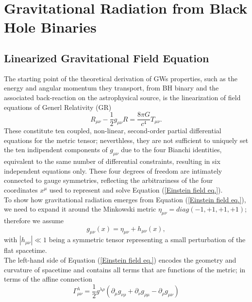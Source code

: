 \documentclass[12pt,twoside,openany]{book}
\begin{document}
\section{Gravitational Radiation from Black Hole Binaries}





\subsection{Linearized Gravitational Field Equation}

The starting point of the theoretical derivation of GWs properties, such as the energy and angular momentum they transport, from BH binary and the associated back-reaction on the astrophysical source, is the linearization of  field equations of Generl Relativity (GR)
\begin{equation}\label{Einstein field eq.}
    R_{\mu \nu}-\frac{1}{2}g_{\mu \nu} R=\frac{8\pi G}{c^4}T_{\mu \nu}.
\end{equation}
These constitute ten coupled, non-linear, second-order partial differential equations for the metric tensor; neverthless, they are not sufficient to uniquely set the ten indipendent components of $g_{\mu\nu}$ due to the four  Bianchi identities, equivalent to the same number of differential constraints, resulting in six  independent equations only. These four degrees of freedom are intimately connected to gauge symmetries, reflecting the arbitrariness of the four coordinates $x^\mu$ used to represent and solve Equation (\ref{Einstein field eq.}).\\To show how gravitational radiation emerges from Equation (\ref{Einstein field eq.}), we need to expand it around the Minkowski metric $\eta_{\mu \nu}=diag(-1,+1,+1,+1)$; therefore we assume
\begin{equation}
    g_{\mu \nu}(x)=\eta_{\mu \nu}+h_{\mu \nu}(x),
\end{equation}
with $|h_{\mu \nu}|\ll1$ being a symmetric tensor representing a small perturbation of the flat spacetime.\\The left-hand side of Equation (\ref{Einstein field eq.}) encodes the geometry and curvature of spacetime and contains all terms that are functions of the metric; in terms of the affine connection
\begin{equation}\label{affine connection def}
    \Gamma^\lambda _{\mu\nu}=\frac{1}{2}g^{\lambda \rho}(\partial_\mu g_{\nu\rho}+\partial_\nu g_{\rho\mu}-\partial_\rho g_{\mu\nu})
\end{equation}
\end{document}
